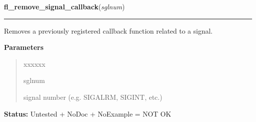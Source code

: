 \hspace{.8\funcindent}\begin{boxedminipage}{\funcwidth}

    \raggedright \textbf{fl\_remove\_signal\_callback}(\textit{sglnum})

    \vspace{-1.5ex}

    \rule{\textwidth}{0.5\fboxrule}
\setlength{\parskip}{2ex}
    Removes a previously registered callback function related to a signal.

\setlength{\parskip}{1ex}
      \textbf{Parameters}
      \vspace{-1ex}

      \begin{quote}
        \begin{Ventry}{xxxxxx}

          \item[sglnum]

          signal number (e.g. SIGALRM, SIGINT, etc.)

        \end{Ventry}

      \end{quote}

\textbf{Status:} Untested + NoDoc + NoExample = NOT OK



    \end{boxedminipage}

    \label{xformslib:library:fl_signal_caught}

    \vspace{0.5ex}

